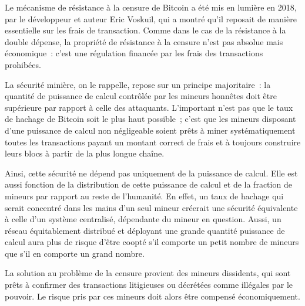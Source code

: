 Le mécanisme de résistance à la censure de Bitcoin a été mis en lumière en 2018, par le développeur et auteur Eric Voskuil, qui a montré qu'il reposait de manière essentielle sur les frais de transaction. Comme dans le cas de la résistance à la double dépense, la propriété de résistance à la censure n'est pas absolue mais économique~: c'est une régulation financée par les frais des transactions prohibées.

La sécurité minière, on le rappelle, repose sur un principe majoritaire~: la quantité de puissance de calcul contrôlée par les mineurs honnêtes doit être supérieure par rapport à celle des attaquants. L'important n'est pas que le taux de hachage de Bitcoin soit le plus haut possible~; c'est que les mineurs disposant d'une puissance de calcul non négligeable soient prêts à miner systématiquement toutes les transactions payant un montant correct de frais et à toujours construire leurs blocs à partir de la plus longue chaîne. %

Ainsi, cette sécurité ne dépend pas uniquement de la puissance de calcul. Elle est aussi fonction de la distribution de cette puissance de calcul et de la fraction de mineurs par rapport au reste de l'humanité. En effet, un taux de hachage qui serait concentré dans les mains d'un seul mineur créerait une sécurité équivalente à celle d'un système centralisé, dépendante du mineur en question. Aussi, un réseau équitablement distribué et déployant une grande quantité puissance de calcul aura plus de risque d'être coopté s'il comporte un petit nombre de mineurs que s'il en comporte un grand nombre.

La solution au problème de la censure provient des mineurs dissidents, qui sont prêts à confirmer des transactions litigieuses ou décrétées comme illégales par le pouvoir. Le risque pris par ces mineurs doit alors être compensé économiquement.

